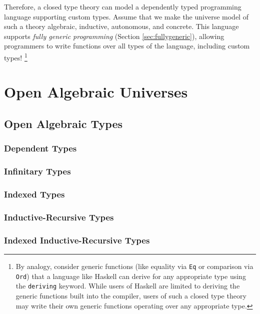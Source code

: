 \documentclass[12pt]{report}
\newcommand{\refsec}[1]{Section \ref{sec:#1}}
\theoremstyle{definition}
\theoremstyle{remark}
\numberwithin{definition}{section}
\numberwithin{equation}{section}
\numberwithin{proposition}{section}
\numberwithin{conjecture}{section}
\numberwithin{theorem}{section}
\numberwithin{lemma}{section}
\numberwithin{corollary}{section}
\numberwithin{example}{section}
\numberwithin{remark}{section}
\begin{document}
Therefore, a closed type theory can model a dependently typed
programming language supporting custom types. Assume that we make
the universe model of such a theory algebraic, inductive, autonomous,
and concrete. This language supports
\textit{fully generic programming} (\refsec{fullygeneric}), allowing
programmers to write functions over all types of the
language, including custom types!
\footnote{By analogy, consider generic functions
  (like equality via \texttt{Eq} or comparison via \texttt{Ord})
  that a language like
  Haskell can derive for any appropriate type using the
  \texttt{deriving} keyword. While users of Haskell are limited to
  deriving the generic functions built into the compiler, users of
  such a closed type theory may write their own generic functions
  operating over any appropriate type.
}



\part{Open Algebraic Universes}\label{part:open}

\chapter{Open Algebraic Types}\label{ch:open}
\section{Dependent Types}
\section{Infinitary Types}
\section{Indexed Types}
\section{Inductive-Recursive Types}
\section{Indexed Inductive-Recursive Types}


\end{document}
